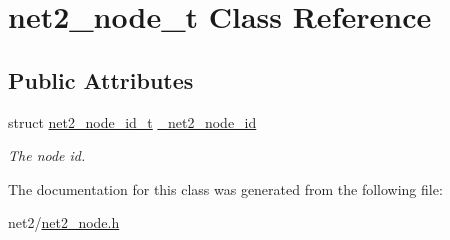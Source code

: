 \hypertarget{structnet2__node__t}{\section{net2\-\_\-node\-\_\-t Class Reference}
\label{structnet2__node__t}
}
\subsection*{Public Attributes}
\begin{DoxyCompactItemize}
\item 
\hypertarget{structnet2__node__t_a9ff8fd051476d5c5d9c46d8ee3fbe466}{struct \hyperlink{structnet2__node__id__t}{net2\-\_\-node\-\_\-id\-\_\-t} \hyperlink{structnet2__node__t_a9ff8fd051476d5c5d9c46d8ee3fbe466}{\-\_\-net2\-\_\-node\-\_\-id}}\label{structnet2__node__t_a9ff8fd051476d5c5d9c46d8ee3fbe466}

\begin{DoxyCompactList}\small\item\em The node id. \end{DoxyCompactList}\end{DoxyCompactItemize}


The documentation for this class was generated from the following file\-:\begin{DoxyCompactItemize}
\item 
net2/\hyperlink{net2__node_8h}{net2\-\_\-node.\-h}\end{DoxyCompactItemize}
